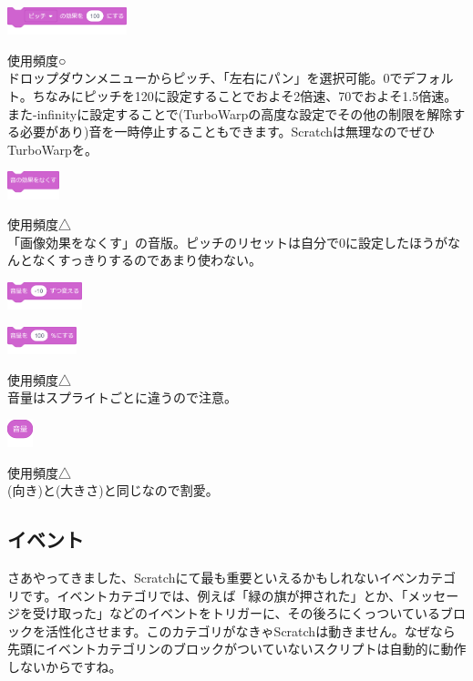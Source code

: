 \documentclass[b5paper,10pt]{jsarticle}
\begin{document}
\begin{multicols*}{3}
\begin{itembox}{4}
\includegraphics[height=8mm]{images/sound_5.png}
\end{itembox}
使用頻度○\\
ドロップダウンメニューからピッチ、「左右にパン」を選択可能。0でデフォルト。ちなみにピッチを120に設定することでおよそ2倍速、70でおよそ1.5倍速。また-infinityに設定することで(TurboWarpの高度な設定でその他の制限を解除する必要があり)音を一時停止することもできます。Scratchは無理なのでぜひTurboWarpを。
\begin{itembox}{5}
\includegraphics[height=8mm]{images/sound_6.png}
\end{itembox}
使用頻度△\\
「画像効果をなくす」の音版。ピッチのリセットは自分で0に設定したほうがなんとなくすっきりするのであまり使わない。
\begin{itembox}{6}
\includegraphics[height=8mm]{images/sound_7.png}

\includegraphics[height=8mm]{images/sound_8.png}
\end{itembox}
使用頻度△\\
音量はスプライトごとに違うので注意。
\begin{itembox}{7}
\includegraphics[height=8mm]{images/sound_9.png}
\end{itembox}
使用頻度△\\
(向き)と(大きさ)と同じなので割愛。

\subsection{イベント}
さあやってきました、Scratchにて最も重要といえるかもしれないイベンカテゴリです。イベントカテゴリでは、例えば「緑の旗が押された」とか、「メッセージを受け取った」などのイベントをトリガーに、その後ろにくっついているブロックを活性化させます。このカテゴリがなきゃScratchは動きません。なぜなら先頭にイベントカテゴリンのブロックがついていないスクリプトは自動的に動作しないからですね。


\end{multicols*}
\end{document}
